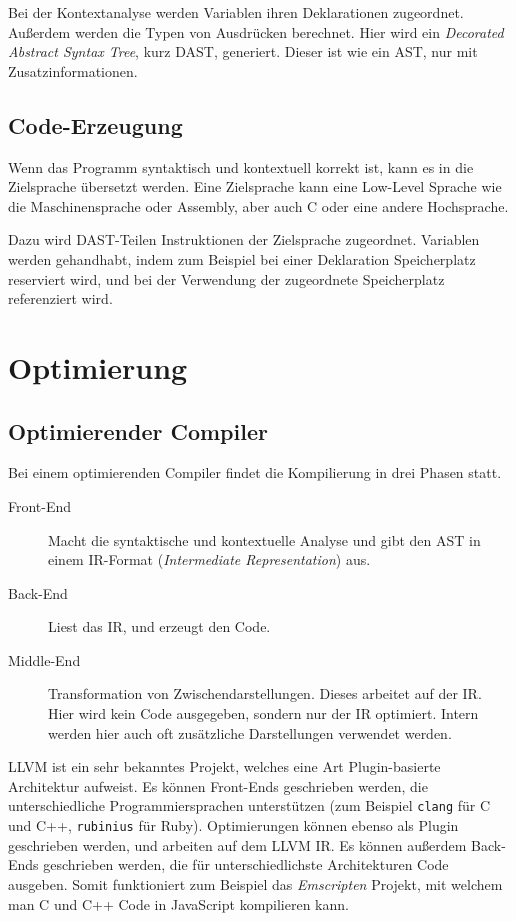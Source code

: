 \documentclass[
  ngerman,
  DIV=12
]{scrartcl}
\begin{document}
Bei der Kontextanalyse werden Variablen ihren Deklarationen zugeordnet. Außerdem werden die Typen von Ausdrücken berechnet. Hier wird ein \emph{Decorated Abstract Syntax Tree}, kurz DAST, generiert. Dieser ist wie ein AST, nur mit Zusatzinformationen.




\subsection{Code-Erzeugung}

Wenn das Programm syntaktisch und kontextuell korrekt ist, kann es in die Zielsprache übersetzt werden. Eine Zielsprache kann eine Low-Level Sprache wie die Maschinensprache oder Assembly, aber auch C oder eine andere Hochsprache.

Dazu wird DAST-Teilen Instruktionen der Zielsprache zugeordnet. Variablen werden gehandhabt, indem zum Beispiel bei einer Deklaration Speicherplatz reserviert wird, und bei der Verwendung der zugeordnete Speicherplatz referenziert wird.

\section{Optimierung}

\subsection{Optimierender Compiler}


Bei einem optimierenden Compiler findet die Kompilierung in drei Phasen statt.

\begin{description}
\item[Front-End] Macht die syntaktische und kontextuelle Analyse und gibt den AST in einem IR-Format (\emph{Intermediate Representation}) aus.
\item[Back-End] Liest das IR, und erzeugt den Code.
\item[Middle-End] Transformation von Zwischendarstellungen. Dieses arbeitet auf der IR. Hier wird kein Code ausgegeben, sondern nur der IR optimiert. Intern werden hier auch oft zusätzliche Darstellungen verwendet werden.
\end{description}

\begin{anmerkung}
LLVM ist ein sehr bekanntes Projekt, welches eine Art Plugin-basierte Architektur aufweist. Es können Front-Ends geschrieben werden, die unterschiedliche Programmiersprachen unterstützen (zum Beispiel \verb|clang| für C und C++, \verb|rubinius| für Ruby). Optimierungen können ebenso als Plugin geschrieben werden, und arbeiten auf dem LLVM IR. Es können außerdem Back-Ends geschrieben werden, die für unterschiedlichste Architekturen Code ausgeben. Somit funktioniert zum Beispiel das \emph{Emscripten} Projekt, mit welchem man C und C++ Code in JavaScript kompilieren kann.
\end{anmerkung}
\end{document}
